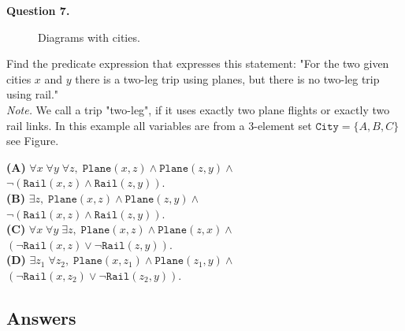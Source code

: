 \documentclass[jou]{apa6}
\begin{document}
\vspace{6pt}
{\bf Question 7.} 
\begin{figure}[!htb]
\caption{\label{fig:relation-graphs} Diagrams with cities.}
\end{figure}

Find the predicate expression that expresses this statement: 
"For the two given cities $x$ and $y$ there is a two-leg trip
using planes, but there is no two-leg trip using rail."\\
{\em Note.} We call a trip "two-leg", if it uses exactly two plane flights
or exactly two rail links. 
In this example all variables are from a 3-element set $\mathtt{City} = \{A,B,C\}$ 
\textendash{} see Figure. 


\noindent
{\bf (A)} $\forall x\;\forall y\; \forall z,\; \mathtt{Plane}(x,z) \wedge \mathtt{Plane}(z,y) \wedge$\\
$\neg \left( \mathtt{Rail}(x,z) \wedge \mathtt{Rail}(z,y) \right)$.\\[3pt]
{\bf (B)} $\exists z,\; \mathtt{Plane}(x,z) \wedge \mathtt{Plane}(z,y) \wedge$\\
$\neg \left(\mathtt{Rail}(x,z) \wedge \mathtt{Rail}(z,y)\right)$.\\[3pt]
{\bf (C)} $\forall x\; \forall y\; \exists z,\; \mathtt{Plane}(x,z) \wedge \mathtt{Plane}(z,x) \wedge$\\
$(\neg \mathtt{Rail}(x,z) \vee \neg \mathtt{Rail}(z,y))$.\\[3pt]
{\bf (D)} $\exists z_1\; \forall z_2,\; \mathtt{Plane}(x,z_1) \wedge \mathtt{Plane}(z_1,y) \wedge$\\
$(\neg \mathtt{Rail}(x,z_2) \vee \neg \mathtt{Rail}(z_2,y))$.





\subsection{Answers}
\end{document}
